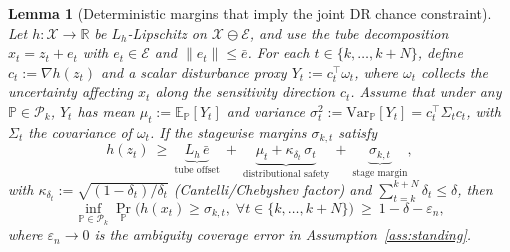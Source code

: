 \documentclass[journal]{IEEEtran}
\newtheorem{lemma}{Lemma}
\theoremstyle{definition}
\begin{document}
 
\begin{lemma}[Deterministic margins that imply the joint DR chance constraint]
\label{lem:margin}
Let $h:\mathcal{X}\!\to\!\mathbb{R}$ be $L_h$-Lipschitz on $\mathcal{X}\ominus\mathcal{E}$, and use the tube decomposition
$x_t=z_t+e_t$ with $e_t\in\mathcal{E}$ and $\|e_t\|\le\bar e$. For each $t\in\{k,\dots,k{+}N\}$, define
$c_t:=\nabla h(z_t)$ and a scalar \emph{disturbance proxy} $Y_t:=c_t^\top\omega_t$, where $\omega_t$ collects the
uncertainty affecting $x_t$ along the sensitivity direction $c_t$. Assume that under any $\mathbb{P}\in\mathcal{P}_k$,
$Y_t$ has mean $\mu_t:=\mathbb{E}_{\mathbb{P}}[Y_t]$ and variance $\sigma_t^2:=\mathrm{Var}_{\mathbb{P}}[Y_t]
= c_t^\top\Sigma_t c_t$, with $\Sigma_t$ the covariance of $\omega_t$. If the stagewise margins $\sigma_{k,t}$ satisfy
\begin{equation}
h(z_t)\ \ge\ \underbrace{L_h\,\bar e}_{\text{tube offset}}
\ +\ \underbrace{\mu_t + \kappa_{\delta_t}\,\sigma_t}_{\text{distributional safety}}
\ +\ \underbrace{\sigma_{k,t}}_{\text{stage margin}},
\label{eq:margin-formula}
\end{equation}
with $\kappa_{\delta_t}:=\sqrt{(1-\delta_t)/\delta_t}$ (Cantelli/Chebyshev factor) and $\sum_{t=k}^{k+N}\delta_t\le \delta$, then
\[
\inf_{\mathbb{P}\in\mathcal{P}_k}
\Pr_{\mathbb{P}}\!\Big(h(x_t)\ge \sigma_{k,t},\;\forall t\in\{k,\dots,k{+}N\}\Big)\ \ge\ 1-\delta-\varepsilon_n,
\]
where $\varepsilon_n\!\to\!0$ is the ambiguity coverage error in Assumption~\ref{ass:standing}.
\end{lemma}
\end{document}
